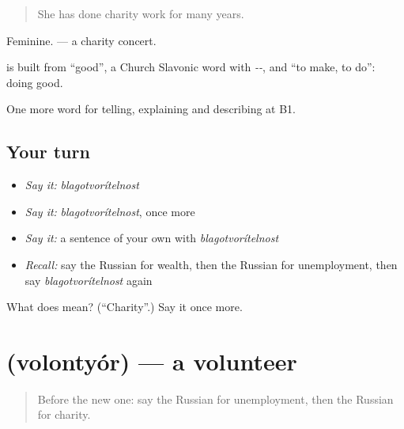 \begin{quote}
She has done charity work for many years.
\end{quote}

Feminine. \emph{ } — a charity concert.

\begin{cousinweb}
\textbf{} is built from \emph{} \textquotedblleft{}good\textquotedblright{}, a Church Slavonic word with \emph{--}, and \emph{} \textquotedblleft{}to make, to do\textquotedblright{}: doing good.
\end{cousinweb}

\begin{grammarlens}[title={What you've built}]
One more word for telling, explaining and describing at B1.
\end{grammarlens}

\subsection*{Your turn}
\begin{itemize}
\raggedright
  \item \emph{Say it:} \emph{blagotvorítelnost}
  \item \emph{Say it:} \emph{blagotvorítelnost}, once more
  \item \emph{Say it:} a sentence of your own with \emph{blagotvorítelnost}
  \item \emph{Recall:} say the Russian for wealth, then the Russian for unemployment, then say \emph{blagotvorítelnost} again
\end{itemize}

\begin{tcolorbox}[breakable,colback=teal!4,colframe=teal!35!black,title={Before you move on}]
What does  mean? (\textquotedblleft{}Charity\textquotedblright{}.) Say it once more.
\end{tcolorbox}
\section[\texorpdfstring{\ru{волонтёр} (volontyór)}{волонтёр (volontyór)}]{ (volontyór) — a volunteer}

\label{lesson:RU-C368-volontyor}



\begin{quote}
Before the new one: say the Russian for unemployment, then the Russian for charity.
\end{quote}

